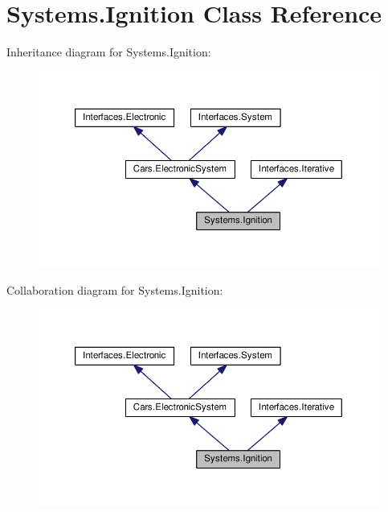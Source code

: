 \hypertarget{classSystems_1_1Ignition}{}\section{Systems.\+Ignition Class Reference}
\label{classSystems_1_1Ignition}


Inheritance diagram for Systems.\+Ignition\+:\nopagebreak
\begin{figure}[H]
\begin{center}
\leavevmode
\includegraphics[width=350pt]{classSystems_1_1Ignition__inherit__graph}
\end{center}
\end{figure}


Collaboration diagram for Systems.\+Ignition\+:\nopagebreak
\begin{figure}[H]
\begin{center}
\leavevmode
\includegraphics[width=350pt]{classSystems_1_1Ignition__coll__graph}
\end{center}
\end{figure}
